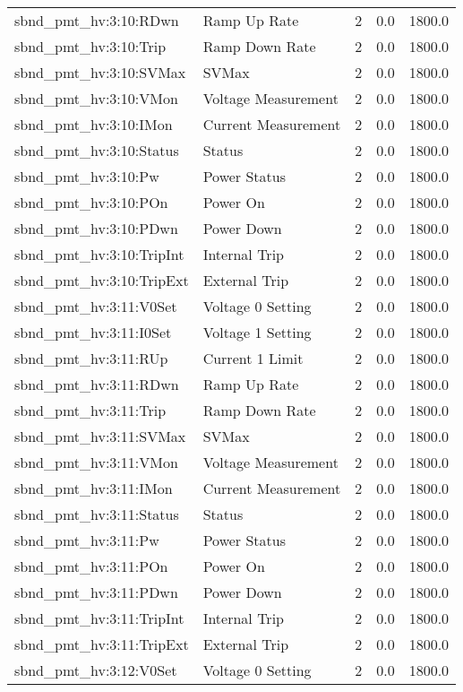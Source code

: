 \begin{center}
\begin{longtable}{l | l l l l }
sbnd\_pmt\_hv:3:10:RDwn & Ramp Up Rate & 2 & 0.0 & 1800.0\\ 
sbnd\_pmt\_hv:3:10:Trip & Ramp Down Rate & 2 & 0.0 & 1800.0\\ 
sbnd\_pmt\_hv:3:10:SVMax & SVMax & 2 & 0.0 & 1800.0\\ 
sbnd\_pmt\_hv:3:10:VMon & Voltage Measurement & 2 & 0.0 & 1800.0\\ 
sbnd\_pmt\_hv:3:10:IMon & Current Measurement & 2 & 0.0 & 1800.0\\ 
sbnd\_pmt\_hv:3:10:Status & Status & 2 & 0.0 & 1800.0\\ 
sbnd\_pmt\_hv:3:10:Pw & Power Status & 2 & 0.0 & 1800.0\\ 
sbnd\_pmt\_hv:3:10:POn & Power On & 2 & 0.0 & 1800.0\\ 
sbnd\_pmt\_hv:3:10:PDwn & Power Down & 2 & 0.0 & 1800.0\\ 
sbnd\_pmt\_hv:3:10:TripInt & Internal Trip & 2 & 0.0 & 1800.0\\ 
sbnd\_pmt\_hv:3:10:TripExt & External Trip & 2 & 0.0 & 1800.0\\ 
sbnd\_pmt\_hv:3:11:V0Set & Voltage 0 Setting & 2 & 0.0 & 1800.0\\ 
sbnd\_pmt\_hv:3:11:I0Set & Voltage 1 Setting & 2 & 0.0 & 1800.0\\ 
sbnd\_pmt\_hv:3:11:RUp & Current 1 Limit & 2 & 0.0 & 1800.0\\ 
sbnd\_pmt\_hv:3:11:RDwn & Ramp Up Rate & 2 & 0.0 & 1800.0\\ 
sbnd\_pmt\_hv:3:11:Trip & Ramp Down Rate & 2 & 0.0 & 1800.0\\ 
sbnd\_pmt\_hv:3:11:SVMax & SVMax & 2 & 0.0 & 1800.0\\ 
sbnd\_pmt\_hv:3:11:VMon & Voltage Measurement & 2 & 0.0 & 1800.0\\ 
sbnd\_pmt\_hv:3:11:IMon & Current Measurement & 2 & 0.0 & 1800.0\\ 
sbnd\_pmt\_hv:3:11:Status & Status & 2 & 0.0 & 1800.0\\ 
sbnd\_pmt\_hv:3:11:Pw & Power Status & 2 & 0.0 & 1800.0\\ 
sbnd\_pmt\_hv:3:11:POn & Power On & 2 & 0.0 & 1800.0\\ 
sbnd\_pmt\_hv:3:11:PDwn & Power Down & 2 & 0.0 & 1800.0\\ 
sbnd\_pmt\_hv:3:11:TripInt & Internal Trip & 2 & 0.0 & 1800.0\\ 
sbnd\_pmt\_hv:3:11:TripExt & External Trip & 2 & 0.0 & 1800.0\\ 
sbnd\_pmt\_hv:3:12:V0Set & Voltage 0 Setting & 2 & 0.0 & 1800.0\\ 

\end{longtable}
\end{center}
